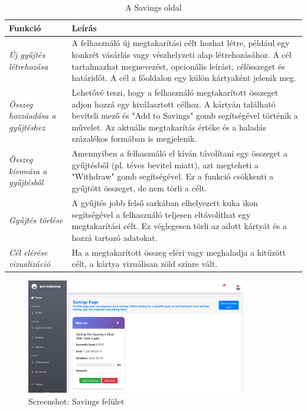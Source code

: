 \begin{table}[H]
	\centering
	\begin{tabular}{ | m{} | m{} | }
		\hline
		\textbf{Funkció} & \textbf{Leírás} \\
		\hline \hline
		
		\emph{Új gyűjtés létrehozása} &
		A felhasználó új megtakarítási célt hozhat létre, például egy konkrét vásárlás vagy vészhelyzeti alap létrehozásához. A cél tartalmazhat megnevezést, opcionális leírást, célösszeget és határidőt. A cél a főoldalon egy külön kártyaként jelenik meg. \\
		
		\hline
		
		\emph{Összeg hozzáadása a gyűjtéshez} &
		Lehetővé teszi, hogy a felhasználó megtakarított összeget adjon hozzá egy kiválasztott célhoz. A kártyán található beviteli mező és "Add to Savings" gomb segítségével történik a művelet. Az aktuális megtakarítás értéke és a haladás százalékos formában is megjelenik. \\
		
		\hline
		
		\emph{Összeg kivonása a gyűjtésből} &
		Amennyiben a felhasználó el kíván távolítani egy összeget a gyűjtésből (pl. téves bevitel miatt), azt megteheti a "Withdraw" gomb segítségével. Ez a funkció csökkenti a gyűjtött összeget, de nem törli a célt. \\
		
		\hline
		
		\emph{Gyűjtés törlése} &
		A gyűjtés jobb felső sarkában elhelyezett kuka ikon segítségével a felhasználó teljesen eltávolíthat egy megtakarítási célt. Ez véglegesen törli az adott kártyát és a hozzá tartozó adatokat. \\
		
		\hline
		
		\emph{Cél elérése vizualizáció} &
		Ha a megtakarított összeg eléri vagy meghaladja a kitűzött célt, a kártya vizuálisan zöld színre vált. \\
		
		\hline
	\end{tabular}
	\caption{A Savings oldal}
	\label{tab:savings}
\end{table}
\begin{figure}[H]
	\centering
	\includegraphics[height=190px]{img/savings}
	\caption{Screenshot: Savings felület}
	\label{fig:savings}
\end{figure}
